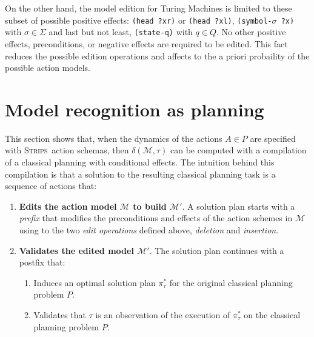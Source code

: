 \documentclass[letterpaper]{article} %
\newcommand{\strips}{\textsc{Strips}}     %
\begin{document}
On the other hand, the model edition for Turing Machines is limited to these subset of possible positive effects: {\tt (head ?xr)} or {\tt (head ?xl)}, {\tt(symbol-$\sigma$ ?x)} with $\sigma \in \Sigma$ and last but not least, {\tt (state-q)} with $q\in Q$. No other positive effects, preconditions, or negative effects are required to be edited. This fact reduces the possible edition operations and affects to the a priori probaility of the possible action models.



\section{Model recognition as planning}
This section shows that, when the dynamics of the actions $A\in P$ are specified with \strips\ action schemas, then $\delta(\mathcal{M},\tau)$ can be computed with a compilation of a classical planning with conditional effects. The intuition behind this compilation is that a solution to the resulting classical planning task is a sequence of actions that:
\begin{enumerate}
\item {\bf Edits the action model $\mathcal{M}$ to build $\mathcal{M}'$}. A solution plan starts with a {\em prefix} that modifies the preconditions and effects of the action schemes in $\mathcal{M}$ using to the two {\em edit operations} defined above, {\em deletion} and {\em insertion}. 
\item {\bf Validates the edited model $\mathcal{M}'$}. The solution plan continues with a postfix that:
\begin{enumerate}
\item Induces an optimal solution plan $\pi^*_\tau$ for the original classical planning problem $P$.
\item Validates that $\tau$ is an observation of the execution of $\pi^*_\tau$ on the classical planning problem $P$.
\end{enumerate}
\end{enumerate}
\end{document}
